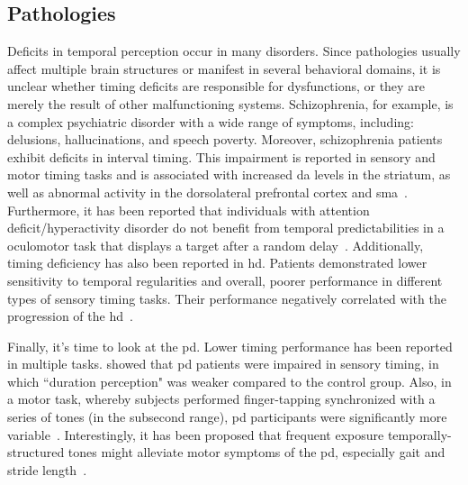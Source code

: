 \subsection{Pathologies}
\label{ch:intro:Time:pathologies}
Deficits in temporal perception occur in many disorders.
Since pathologies usually affect multiple brain structures or manifest in several behavioral domains, it is unclear whether timing deficits are responsible for dysfunctions, or they are merely the result of other malfunctioning systems.
Schizophrenia, for example, is a complex psychiatric disorder with a wide range of symptoms, including: delusions, hallucinations, and speech poverty.
Moreover, schizophrenia patients exhibit deficits in interval timing.
This impairment is reported in sensory and motor timing tasks and is associated with increased \gls{da} levels in the striatum, as well as abnormal activity in the dorsolateral prefrontal cortex and \gls{sma}~\cite[see][]{Snowden2019}.
Furthermore, it has been reported that individuals with attention deficit/hyperactivity disorder do not benefit from temporal predictabilities in a oculomotor task that displays a target after a random delay~\cite{Dankner2017}.
Additionally, timing deficiency has also been reported in \gls{hd}.
Patients demonstrated lower sensitivity to temporal regularities and overall, poorer performance in different types of sensory timing tasks.
Their performance negatively correlated with the progression of the \gls{hd}~\cite{Cope2014}.
\par
Finally, it's time to look at the \gls{pd}.\footnotemark
{}
Lower timing performance has been reported in multiple tasks.
 showed that \gls{pd} patients were impaired in sensory timing, in which ``duration perception" was weaker compared to the control group.
Also, in a motor task, whereby subjects performed finger-tapping synchronized with a series of tones (in the subsecond range), \gls{pd} participants were significantly more variable~\cite{Harrington1998}.
Interestingly, it has been proposed that frequent exposure temporally-structured tones might alleviate motor symptoms of the \gls{pd}, especially gait and stride length~\cite{Dalla2017}.